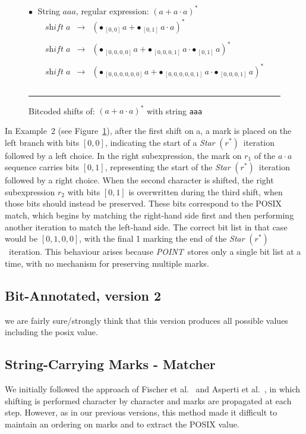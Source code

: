 \documentclass[12pt]{article}
\newcommand{\shift}{\textit{shift}}
\newcommand{\Marked}[1]{\bullet\,#1}
\newcommand{\POINT}{\textit{POINT}}
\newcommand{\STARText}{\textit{Star} $(r^*)$}
\begin{document}
  \begin{figure}[ht]
    $\bullet\;$ String $aaa$, regular expression: $(a + a \cdot a)^*$
    \[
    \begin{array}{rcl}
      \shift\; a & \rightarrow & ( \Marked{_{[0,0]\,} a} +  \Marked{_{[0,1]}\,a \cdot a} )^*\\\\
      \shift\; a & \rightarrow & ( \Marked{_{[0,0,0,0]\,} a} +  \Marked{_{[0,0,0,1]}\,a \cdot \Marked{_{[0,1]}\,a} } )^*\\\\ 
      \shift\; a & \rightarrow & ( \Marked{_{[0,0,0,0,0,0]\,} a} +  \Marked{_{[0,0,0,0,0,1]}\,a \cdot \Marked{_{[0,0,0,1]}\,a} } )^*\\\\
    \end{array}
    \]

    \mbox{}
    \hrule
    
    \caption{Bitcoded shifts of: $(a + a \cdot a)^*$ with string \texttt{aaa}} \label{BitAnnotatedShiftExample2}
  \end{figure}
In Example~2 (see Figure~\ref{BitAnnotatedShiftExample2}), after the first shift on a, a mark is
placed on the left branch with bits $[0,0]$, indicating the start of a \STARText\ iteration followed by a
left choice. In the right subexpression, the mark on $r_1$ of the $a \cdot a$ sequence carries bits $[0,1]$,
representing the start of the \STARText\ iteration followed by a right choice. When the second character is shifted, the right subexpression $r_2$ with bits $[0,1]$ is overwritten during
the third shift, when those bits should instead be preserved. These bits correspond to the POSIX match,
which begins by matching the right-hand side first and then performing another iteration to match the
left-hand side. The correct bit list in that case would be $[0,1,0,0]$, with the final 1 marking the end of
the \STARText\ iteration. This behaviour arises because \POINT\ stores only a single bit list at a time,
with no mechanism for preserving multiple marks.

  
\FloatBarrier
\subsection{Bit-Annotated, version 2}
we are fairly sure/strongly think that this version produces all possible values including the posix value.

\FloatBarrier
\subsection{String-Carrying Marks - Matcher}
We initially followed the approach of Fischer et al.~\cite{Fischer2010} and Asperti et al.~\cite{Asperti2010}, in which shifting is performed character by 
character and marks are propagated at each step. However, as in our previous versions, this method made it difficult to maintain an ordering on marks and to 
extract the POSIX value.  
\end{document}
